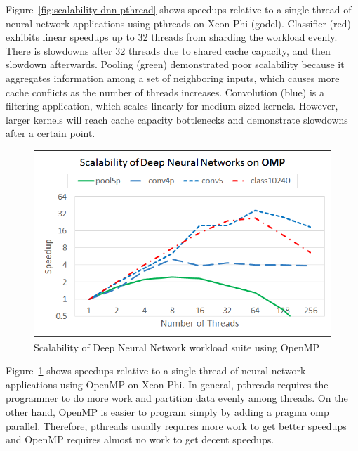 Figure~\ref{fig:scalability-dnn-pthread} shows speedups relative to a single 
thread of neural network applications using pthreads on Xeon Phi (godel). 
Classifier (red) exhibits linear speedups up to 32 threads from sharding the 
workload evenly. There is slowdowns after 32 threads due to  shared cache 
capacity, and then slowdown afterwards. Pooling (green) demonstrated poor 
scalability because it aggregates information among a set of neighboring 
inputs, which causes more cache conflicts as the number of threads increases. 
Convolution (blue) is a filtering application, which scales linearly for medium 
sized kernels. However, larger kernels will reach cache capacity bottlenecks and 
demonstrate slowdowns after a certain point. 


\begin{figure}
  \begin{center}
    \includegraphics[width=\linewidth]{cs758-figs/scalability-dnn-omp.png}
  \end{center}
\vspace{-0.2in}
  \caption{Scalability of Deep Neural Network workload suite using OpenMP}
  \label{fig:scalability-dnn-omp}
\vspace{-0.05in}
\end{figure}

Figure~\ref{fig:scalability-dnn-omp} shows speedups relative to a single thread 
of neural network applications using OpenMP on Xeon Phi. In general, pthreads 
requires the programmer to do more work and partition data evenly among threads. 
On the other hand, OpenMP is easier to program simply by adding a pragma omp 
parallel. Therefore, pthreads usually requires more work to get better speedups 
and OpenMP requires almost no work to get decent speedups. 



